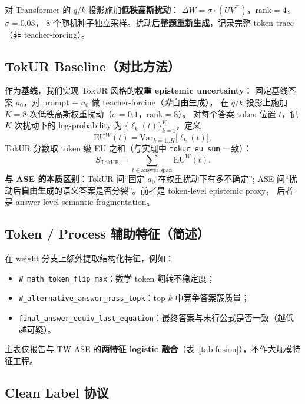 \documentclass[11pt,a4paper]{article}
\begin{document}
对 Transformer 的 $q/k$ 投影施加\textbf{低秩高斯扰动}：
$\Delta W = \sigma \cdot (U V^\top)$，$\mathrm{rank}{=}4$，$\sigma{=}0.03$，
8 个随机种子独立采样。扰动后\textbf{整题重新生成}，记录完整 token trace（非 teacher-forcing）。

\subsection{TokUR Baseline（对比方法）}

作为\textbf{基线}，我们实现 TokUR 风格的\textbf{权重 epistemic uncertainty}：
固定基线答案 $a_0$，对 prompt + $a_0$ 做 teacher-forcing（\emph{非}自由生成），
在 $q/k$ 投影上施加 $K{=}8$ 次低秩高斯权重扰动（$\sigma{=}0.1$，$\mathrm{rank}{=}8$）。
对每个答案 token 位置 $t$，记 $K$ 次扰动下的 log-probability 为 $\{\ell_k(t)\}_{k=1}^K$，定义
\begin{equation}
  \mathrm{EU}^{W}(t) = \mathrm{Var}_{k=1..K}\big[\ell_k(t)\big],
\end{equation}
TokUR 分数取 token 级 EU 之和（与实现中 \texttt{tokur\_eu\_sum} 一致）：
\begin{equation}
  S_{\mathrm{TokUR}} = \sum_{t \in \text{answer span}} \mathrm{EU}^{W}(t).
\end{equation}
\textbf{与 ASE 的本质区别}：TokUR 问``固定 $a_0$ 在权重扰动下有多不确定'';
ASE 问``扰动后\textbf{自由生成}的语义答案是否分裂''。前者是 token-level epistemic proxy，
后者是 answer-level semantic fragmentation。

\subsection{Token / Process 辅助特征（简述）}

在 weight 分支上额外提取结构化特征，例如：
\begin{itemize}
  \item \texttt{W\_math\_token\_flip\_max}：数学 token 翻转不稳定度；
  \item \texttt{W\_alternative\_answer\_mass\_topk}：top-$k$ 中竞争答案簇质量；
  \item \texttt{final\_answer\_equiv\_last\_equation}：最终答案与末行公式是否一致（越低越可疑）。
\end{itemize}
主表仅报告与 TW-ASE 的\textbf{两特征 logistic 融合}（表~\ref{tab:fusion}），不作大规模特征工程。

\subsection{Clean Label 协议}
\end{document}
